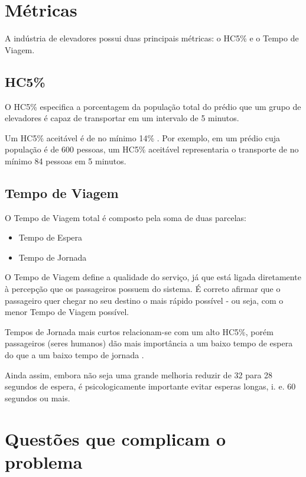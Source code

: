 \section{Métricas}

  A indústria de elevadores possui duas principais métricas: o HC5\% e o Tempo de Viagem.

\subsection{HC5\%}

 O HC5\% especifica a porcentagem da população total do prédio que um grupo de elevadores é capaz de transportar em um intervalo de 5 minutos.

 Um HC5\% aceitável é de no mínimo 14\% \cite{KOEHLEROTTIGER02}. Por exemplo, em um prédio cuja população é de 600 pessoas, um HC5\% aceitável representaria o transporte de no mínimo 84 pessoas em 5 minutos.

\subsection{Tempo de Viagem}

  O Tempo de Viagem total é composto pela soma de duas parcelas:

  \begin{itemize}
    \item Tempo de Espera
    \item Tempo de Jornada
  \end{itemize}

  O Tempo de Viagem define a qualidade do serviço, já que está ligada diretamente à percepção que os passageiros possuem do sistema. É correto afirmar que o passageiro quer chegar no seu destino o mais rápido possível - ou seja, com o menor Tempo de Viagem possível.

  Tempos de Jornada mais curtos relacionam-se com um alto HC5\%, porém passageiros (seres humanos) dão mais importância a um baixo tempo de espera do que a um baixo tempo de jornada \cite{KOEHLEROTTIGER02}.

  Ainda assim, embora não seja uma grande melhoria reduzir de 32 para 28 segundos de espera, é psicologicamente importante evitar esperas longas, i. e. 60 segundos ou mais.

\section{Questões que complicam o problema}

